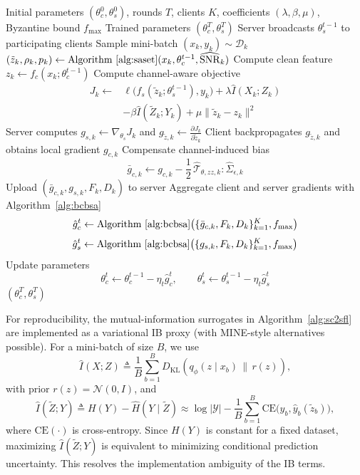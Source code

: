 \documentclass[10pt,journal]{IEEEtran}
\begin{document}
\begin{algorithm}[t]
\caption{Proposed Semantic-Capacity-Constrained Split Federated Learning (SC$^2$-SFL)}
\label{alg:sc2sfl}
\begin{algorithmic}[1]
\REQUIRE Initial parameters $(\theta_c^0,\theta_s^0)$, rounds $T$, clients $K$, coefficients $(\lambda,\beta,\mu)$, Byzantine bound $f_{\max}$
\ENSURE Trained parameters $(\theta_c^T,\theta_s^T)$
\STATE Server broadcasts $\theta_s^{t-1}$ to participating clients
\STATE Sample mini-batch $(x_k,y_k)\sim\mathcal{D}_k$
\STATE $(\tilde{z}_k,\rho_k,p_k) \leftarrow \text{Algorithm~\ref{alg:saset}}(x_k,\theta_c^{t-1},\widehat{\mathrm{SNR}}_k)$
\STATE Compute clean feature $z_k \leftarrow f_c(x_k;\theta_c^{t-1})$
\STATE Compute channel-aware objective
\[
\begin{aligned}
J_k \leftarrow {}& \ell\big(f_s(\tilde{z}_k;\theta_s^{t-1}),y_k\big)
+\lambda\widehat{I}(X_k;Z_k) \\
&-\beta\widehat{I}(\tilde{Z}_k;Y_k)
+\mu\|\tilde{z}_k-z_k\|^2
\end{aligned}
\]
\STATE Server computes $g_{s,k}\leftarrow\nabla_{\theta_s}J_k$ and $g_{\tilde{z},k}\leftarrow\frac{\partial J_k}{\partial \tilde{z}_k}$
\STATE Client backpropagates $g_{\tilde{z},k}$ and obtains local gradient $g_{c,k}$
\STATE Compensate channel-induced bias\[\bar{g}_{c,k} \leftarrow g_{c,k}-\frac{1}{2}\,\widehat{\mathcal{T}}_{\theta,zz,k}:\widehat{\Sigma}_{\epsilon,k}\]
\STATE Upload $(\bar{g}_{c,k},g_{s,k},F_k,D_k)$ to server
\ENDFOR
\STATE Aggregate client and server gradients with Algorithm~\ref{alg:bcbsa}\[\hat{g}_c^t \leftarrow \text{Algorithm~\ref{alg:bcbsa}}\big(\{\bar{g}_{c,k},F_k,D_k\}_{k=1}^K,f_{\max}\big)\]\[\hat{g}_s^t \leftarrow \text{Algorithm~\ref{alg:bcbsa}}\big(\{g_{s,k},F_k,D_k\}_{k=1}^K,f_{\max}\big)\]
\STATE Update parameters\[\theta_c^t \leftarrow \theta_c^{t-1}-\eta_t\hat{g}_c^t,\qquad\theta_s^t \leftarrow \theta_s^{t-1}-\eta_t\hat{g}_s^t\]
\ENDFOR
\RETURN $(\theta_c^T,\theta_s^T)$
\end{algorithmic}
\end{algorithm}
For reproducibility, the mutual-information surrogates in Algorithm~\ref{alg:sc2sfl} are implemented as a variational IB proxy\cite{alemi2017vib} (with MINE-style alternatives possible\cite{belghazi2018mine}). For a mini-batch of size $B$, we use
\begin{equation}
\widehat{I}(X;Z)
\triangleq
\frac{1}{B}\sum_{b=1}^{B}
D_{\mathrm{KL}}\!\left(q_\phi(z\mid x_b)\,\|\,r(z)\right),
\end{equation}
with prior $r(z)=\mathcal{N}(0,I)$, and
\begin{equation}
\widehat{I}(\tilde{Z};Y)
\triangleq
H(Y)-\widehat{H}(Y\mid\tilde{Z})
\approx
\log |\mathcal{Y}|-\frac{1}{B}\sum_{b=1}^{B}\mathrm{CE}\big(y_b,\hat{y}_b(\tilde{z}_b)\big),
\end{equation}
where $\mathrm{CE}(\cdot)$ is cross-entropy. Since $H(Y)$ is constant for a fixed dataset, maximizing $\widehat{I}(\tilde{Z};Y)$ is equivalent to minimizing conditional prediction uncertainty. This resolves the implementation ambiguity of the IB terms.
\end{document}
